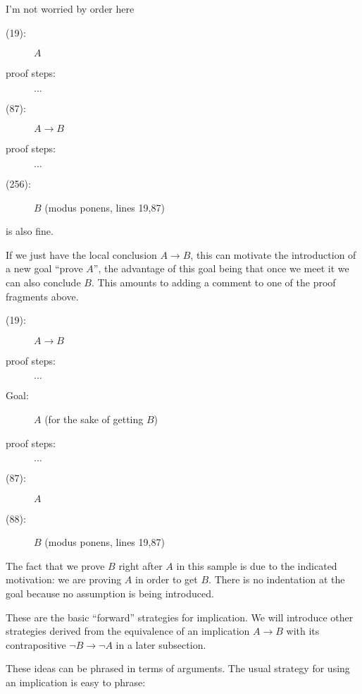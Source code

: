 \documentclass[12pt]{article}
\begin{document}
I'm not worried by order here

\begin{description}
\item[(19):]  $A$

\item[proof steps:]  $\ldots$

\item[(87):]  $A\rightarrow B$

\item[proof steps:]  $\ldots$

\item [(256):]  $B$ (modus ponens, lines 19,87)

\end{description}

is also fine.

If we just have the local conclusion $A \rightarrow B$, this can
motivate the introduction of a new goal ``prove $A$'', the advantage
of this goal being that once we meet it we can also conclude $B$.  This amounts to adding a comment to one of the proof fragments above.

\begin{description}
\item[(19):]  $A \rightarrow B$

\item[proof steps:]  $\ldots$

\item[Goal:]  $A$  (for the sake of getting $B$)

\item[proof steps:] $\ldots$

\item[(87):]  $A$

\item [(88):]  $B$ (modus ponens, lines 19,87)

\end{description}

The fact that we prove $B$ right after $A$ in this sample is due to the indicated motivation:  we are proving $A$ in order to get $B$.  There is
no indentation at the goal because no assumption is being introduced.


These are the basic ``forward'' strategies for implication.  We will
introduce other strategies derived from the equivalence of an
implication $A \rightarrow B$ with its contrapositive $\neg B
\rightarrow \neg A$ in a later subsection.

These ideas can be phrased in terms of arguments.  The usual strategy for using an implication is easy to phrase:
\end{document}
